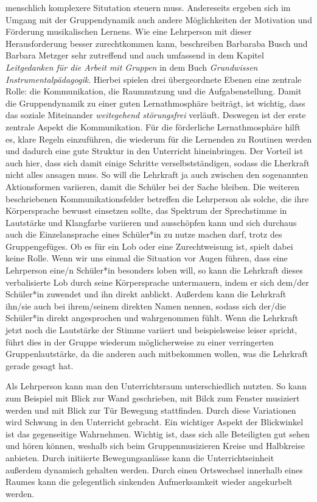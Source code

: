 menschlich komplexere Situtation steuern muss. Andereseits ergeben sich im
Umgang mit der Gruppendynamik auch andere Möglichkeiten der Motivation und
Förderung musikalischen Lernens. Wie eine Lehrperson mit dieser Herausforderung
besser zurechtkommen kann, beschreiben Barbaraba Busch und Barbara Metzger sehr
zutreffend und auch umfassend in dem Kapitel \emph{Leitgedanken für die Arbeit
mit Gruppen} in dem Buch \emph{Grundwissen Instrumentalpädagogik}. Hierbei
spielen drei übergeordnete Ebenen eine zentrale Rolle: die Kommunikation, die
Raumnutzung und die Aufgabenstellung. Damit die Gruppendynamik zu einer guten
Lernathmosphäre beiträgt, ist wichtig, dass das soziale Miteinander
\emph{weitegehend störungsfrei} verläuft. Deswegen ist der erste zentrale Aspekt
die Kommunikation. Für die förderliche Lernathmosphäre hilft es, klare Regeln
einzuführen, die wiederum für die Lernenden zu Routinen werden und dadurch eine
gute Struktur in den Unterricht hineinbringen. Der Vorteil ist auch hier, dass
sich damit einige Schritte verselbstständigen, sodass die Lherkraft nicht alles
ansagen muss. So will die Lehrkraft ja auch zwischen den sogenannten
Aktionsformen variieren, damit die Schüler bei der Sache bleiben. Die weiteren
beschriebenen Kommunikationsfelder betreffen die Lehrperson als solche, die ihre
Körpersprache bewusst einsetzen sollte, das Spektrum der Sprechstimme in
Lautstärke und Klangfarbe variieren und ausschöpfen kann und sich durchaus auch
die Einzelansprache eines Schüler*in zu nutze machen darf, trotz des
Gruppengefüges. Ob es für ein Lob oder eine Zurechtweisung ist, spielt dabei
keine Rolle. Wenn wir uns einmal die Situation vor Augen führen, dass eine
Lehrperson eine/n Schüler*in besonders loben will, so kann die Lehrkraft dieses
verbalisierte Lob durch seine Körpersprache untermauern, indem er sich dem/der
Schüler*in zuwendet und ihn direkt anblickt. Außerdem kann die Lehrkraft ihn/sie
auch bei ihrem/seinem direkten Namen nennen, sodass sich der/die Schüler*in
direkt angesprochen und wahrgenommen fühlt. Wenn die Lehrkraft jetzt noch die
Lautstärke der Stimme variiert und beispielsweise leiser spricht, führt dies in
der Gruppe wiederum möglicherweise zu einer verringerten Gruppenlautstärke, da
die anderen auch mitbekommen wollen, was die Lehrkraft gerade gesagt hat. 

Als Lehrperson kann man den Unterrichtsraum unterschiedlich nutzten. So kann zum
Beispiel mit Blick zur Wand geschrieben, mit Bilck zum Fenster musiziert werden
und mit Blick zur Tür Bewegung stattfinden. Durch diese Variationen wird Schwung
in den Unterricht gebracht. Ein wichtiger Aspekt der Blickwinkel ist das
gegenseitige Wahrnehmen. Wichtig ist, dass sich alle Beteiligten gut sehen und
hören können, weshalb sich beim Gruppenmusizieren Kreise und Halbkreise
anbieten. Durch initiierte Bewegungsanlässe kann die Unterrichtseinheit außerdem
dynamisch gehalten werden. Durch einen Ortswechsel innerhalb eines Raumes kann
die gelegentlich sinkenden Aufmerksamkeit wieder angekurbelt werden. 

